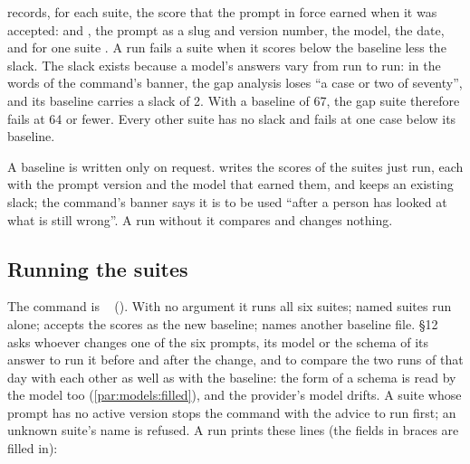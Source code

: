  records, for each suite, the score that the prompt in force
earned when it was accepted:  and , the prompt as a slug and version
number, the model, the date, and for one suite . A run fails a suite when it
scores below the baseline less the slack. The slack exists because a model's answers vary
from run to run: in the words of the command's banner, the gap analysis loses \enquote{a case
or two of seventy}, and its baseline carries a slack of 2. With a baseline of 67, the gap
suite therefore fails at 64 or fewer. Every other suite has no slack and fails at one case
below its baseline.

A baseline is written only on request.  writes the scores of the suites just
run, each with the prompt version and the model that earned them, and keeps an existing slack;
the command's banner says it is to be used \enquote{after a person has looked at what is still
wrong}. A run without it compares and changes nothing.

\subsection{Running the suites}\label{sec:control:command}

The command is ~
(). With no argument it runs all six
suites; named suites run alone;  accepts the scores as the new baseline;
 names another baseline file.  §12 asks whoever
changes one of the six prompts, its model or the schema of its answer to run it before and
after the change, and to compare the two runs of that day with each other as well as with the
baseline: the form of a schema is read by the model too (\cref{par:models:filled}), and the
provider's model drifts. A suite
whose prompt has no active version stops the command with the advice to run
 first; an unknown suite's name is refused. A run prints these lines (the
fields in braces are filled in):


